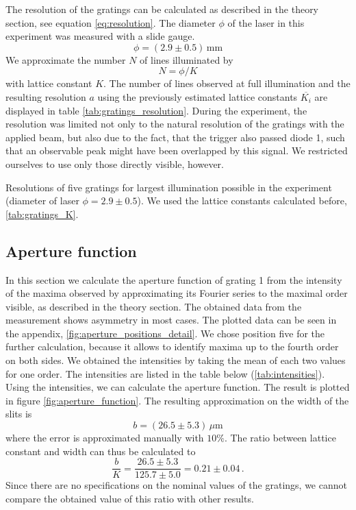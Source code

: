 The resolution of the gratings can be calculated as described in the theory section, 
see equation \eqref{eq:resolution}.
The diameter $\phi$ of the laser in this experiment was measured with a slide gauge. 
\begin{equation}
    \phi = (2.9 \pm 0.5) \, \mathrm{mm}
\end{equation}
We approximate the number $N$ of lines illuminated by
\begin{equation}
    N = \phi / K
\end{equation}
with lattice constant $K$. The number of lines observed at full illumination and the
resulting resolution $a$ using the previously estimated lattice constants $\overline{K_i}$
are displayed in table \ref{tab:gratings_resolution}. During the experiment, the resolution was 
limited not only to the natural resolution of the gratings with the applied beam, but 
also due to the fact, that the trigger also passed diode 1, such that an observable peak
might have been overlapped by this signal. We restricted ourselves to use only those
directly visible, however. 

\begin{table}[htdp]
    \centering
    
    \caption{
        Resolutions of five gratings for largest illumination possible 
        in the experiment (diameter of laser $\phi = 2.9 \pm 0.5$). 
        We used the lattice constants calculated before, \ref{tab:gratings_K}. 
        }
    \label{tab:gratings_resolution}
\end{table}

\subsection{Aperture function}
In this section we calculate the aperture function of grating 1 from the intensity 
of the maxima observed by approximating its Fourier series to the maximal 
order visible, as described in the theory section. The obtained data from the measurement 
shows asymmetry in most cases. The plotted data can be seen in the appendix, 
\ref{fig:aperture_positions_detail}. We chose position five for the further calculation, 
because it allows to identify maxima up to the fourth order on both sides. 
We obtained the intensities by taking the mean of each two values for one order. 
The intensities are listed in the table below (\ref{tab:intensities}). 
Using the intensities, we can calculate the aperture function. 
The result is plotted in figure \ref{fig:aperture_function}. 
The resulting approximation on the width of the slits is 
\begin{equation}
    b = (26.5 \pm 5.3)\, \mu\mathrm{m}
\end{equation}
where the error is approximated manually with $10\%$. The ratio between 
lattice constant and width can thus be calculated to 
\begin{equation}
	\frac{b}{K} = \frac{ 26.5 \pm 5.3 }{ 125.7 \pm 5.0 } = 0.21 \pm 0.04  \, .
\end{equation}
Since there are no specifications on the nominal values of the gratings, we cannot 
compare the obtained value of this ratio with other results. 



